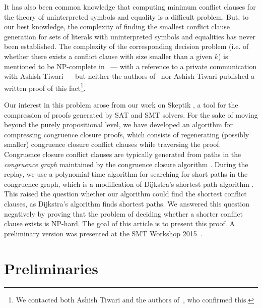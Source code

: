 \documentclass[smallextended]{svjour3}
\begin{document}
It has also been common knowledge that computing minimum conflict clauses for
the theory of uninterpreted symbols and equality is a difficult problem.  But,
to our best knowledge, the complexity of finding the smallest conflict clause generation
for sets of literals with uninterpreted symbols and equalities has never been
established.  The complexity of the corresponding decision problem (i.e. of whether there exists a conflict clause with size smaller than a given $k$) is mentioned to be NP-complete in~\cite{Nieuwenhuis6} --- with
a reference to a private communication with Ashish Tiwari --- but neither the
authors of~\cite{Nieuwenhuis6} nor Ashish Tiwari published a written proof of
this fact\footnote{We contacted both Ashish Tiwari and the authors
  of~\cite{Nieuwenhuis6}, who confirmed this.}.

Our interest in this problem arose from our work on Skeptik \cite{Boudou1}, a tool for the compression of proofs generated by SAT and SMT solvers. For the sake of moving beyond the purely propositional level, we have developed an algorithm for compressing congruence closure proofs, which consists of regenerating (possibly smaller) congruence closure conflict clauses while traversing the proof. Congruence closure conflict clauses are typically generated from paths in the \emph{congruence graph} maintained by the congruence closure algorithm \cite{Fontaine2004,Nieuwenhuis6,Nieuwenhuis9}. During the replay, we use a polynomial-time algorithm for searching for short paths in the congruence graph, which is a modification of Dijkstra's shortest path algorithm \cite{Dijkstra1959}. This raised the question whether our algorithm could find the shortest conflict clauses, as Dijkstra's algorithm finds shortest paths. We answered this question negatively by proving that the problem of deciding whether a shorter conflict clause exists is NP-hard. The goal of this article is to present this proof.
A preliminary version was presented at the SMT Workshop 2015~\cite{Fellner1}.

\section{Preliminaries}
\end{document}
